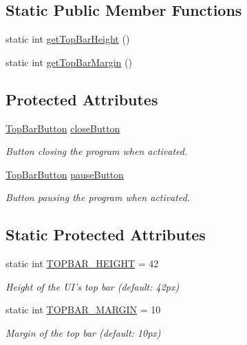 \subsection*{Static Public Member Functions}
\begin{DoxyCompactItemize}
\item 
static int \hyperlink{classwindow_1_1topbar_1_1_top_bar_a847fe55578ff23c63533ff68168c8fed}{get\-Top\-Bar\-Height} ()
\item 
static int \hyperlink{classwindow_1_1topbar_1_1_top_bar_adfdb55a34a781ed9c1c28dcc820b10e3}{get\-Top\-Bar\-Margin} ()
\end{DoxyCompactItemize}
\subsection*{Protected Attributes}
\begin{DoxyCompactItemize}
\item 
\hyperlink{classwindow_1_1topbar_1_1_top_bar_button}{Top\-Bar\-Button} \hyperlink{classwindow_1_1topbar_1_1_top_bar_a98271c11b9bbb79d1e79e03752d4e0b4}{close\-Button}
\begin{DoxyCompactList}\small\item\em Button closing the program when activated. \end{DoxyCompactList}\item 
\hyperlink{classwindow_1_1topbar_1_1_top_bar_button}{Top\-Bar\-Button} \hyperlink{classwindow_1_1topbar_1_1_top_bar_ac7b4f88657cb97d1ae3df6a99d3694e9}{pause\-Button}
\begin{DoxyCompactList}\small\item\em Button pausing the program when activated. \end{DoxyCompactList}\end{DoxyCompactItemize}
\subsection*{Static Protected Attributes}
\begin{DoxyCompactItemize}
\item 
static int \hyperlink{classwindow_1_1topbar_1_1_top_bar_aa7100cb3da5276c12e4fae659823bf4e}{T\-O\-P\-B\-A\-R\-\_\-\-H\-E\-I\-G\-H\-T} = 42
\begin{DoxyCompactList}\small\item\em Height of the U\-I's top bar (default\-: 42px) \end{DoxyCompactList}\item 
static int \hyperlink{classwindow_1_1topbar_1_1_top_bar_a8d48486507d36a825223a21b1b6333ac}{T\-O\-P\-B\-A\-R\-\_\-\-M\-A\-R\-G\-I\-N} = 10
\begin{DoxyCompactList}\small\item\em Margin of the top bar (default\-: 10px) \end{DoxyCompactList}\end{DoxyCompactItemize}


